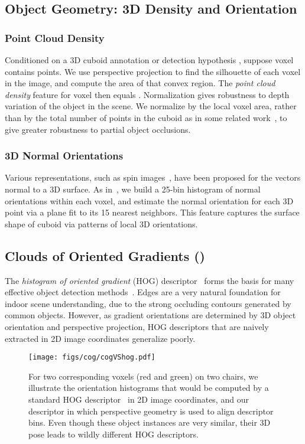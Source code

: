 \subsection{Object Geometry: 3D Density and Orientation}
\subsubsection{Point Cloud Density}
Conditioned on a 3D cuboid annotation or detection hypothesis , suppose voxel  contains  points.  We use perspective projection to find the silhouette of each voxel in the image, and compute the area  of that convex region.  The \emph{point cloud density} feature for voxel  then equals .  Normalization gives robustness to depth variation of the object in the scene.  We normalize by the local voxel area, rather than by the total number of points in the cuboid as in some related work~\cite{song2014sliding}, to give greater robustness to partial object occlusions.


\subsubsection{3D Normal Orientations}
Various representations, such as spin images~\cite{johnson1999using}, have been proposed for the vectors normal to a 3D surface.  As in~\cite{song2014sliding}, we build a 25-bin histogram of normal orientations within each voxel, and estimate the normal orientation for each 3D point via a plane fit to its 15 nearest neighbors. This feature  captures the surface shape of cuboid  via patterns of local 3D orientations.


\subsection{Clouds of Oriented Gradients (\cog)}


The \emph{histogram of oriented gradient} (HOG) descriptor~\cite{dalal2005histograms} forms the basis for many effective object detection methods~\cite{pascal-voc-2012}.  Edges are a very natural foundation for indoor scene understanding, due to the strong occluding contours generated by common objects.  However, as gradient orientations are determined by 3D object orientation and perspective projection, HOG descriptors that are naively extracted in 2D image coordinates generalize poorly.

\begin{figure}[t]
\centering
   \texttt{[image: figs/cog/cogVShog.pdf]}
 \caption{For two corresponding voxels (red and green) on two chairs, we illustrate the orientation histograms that would be computed by a standard HOG descriptor~\cite{dalal2005histograms} in 2D image coordinates, and our \cog descriptor in which perspective geometry is used to align descriptor bins.  Even though these object instances are very similar, their 3D pose leads to wildly different HOG descriptors.}
\label{fig:cog_hog}
\end{figure}

